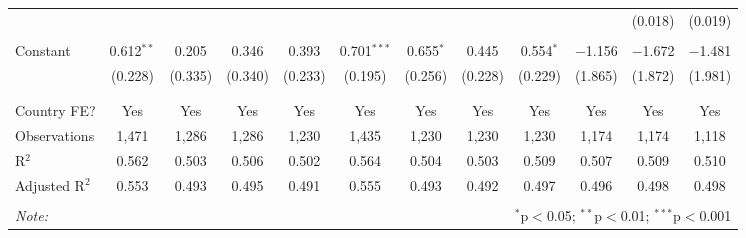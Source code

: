 \begin{table}[!htbp]
\begin{tabular}{@{\extracolsep{5pt}}lccccccccccc}
  &  &  &  &  &  &  &  &  &  & (0.018) & (0.019) \\ 
  & & & & & & & & & & & \\ 
 Constant & 0.612$^{**}$ & 0.205 & 0.346 & 0.393 & 0.701$^{***}$ & 0.655$^{*}$ & 0.445 & 0.554$^{*}$ & $-$1.156 & $-$1.672 & $-$1.481 \\ 
  & (0.228) & (0.335) & (0.340) & (0.233) & (0.195) & (0.256) & (0.228) & (0.229) & (1.865) & (1.872) & (1.981) \\ 
  & & & & & & & & & & & \\ 
\hline \\[-1.8ex] 
Country FE? & Yes & Yes & Yes & Yes & Yes & Yes & Yes & Yes & Yes & Yes & Yes \\ 
Observations & 1,471 & 1,286 & 1,286 & 1,230 & 1,435 & 1,230 & 1,230 & 1,230 & 1,174 & 1,174 & 1,118 \\ 
R$^{2}$ & 0.562 & 0.503 & 0.506 & 0.502 & 0.564 & 0.504 & 0.503 & 0.509 & 0.507 & 0.509 & 0.510 \\ 
Adjusted R$^{2}$ & 0.553 & 0.493 & 0.495 & 0.491 & 0.555 & 0.493 & 0.492 & 0.497 & 0.496 & 0.498 & 0.498 \\ 
\hline 
\hline \\[-1.8ex] 
\textit{Note:}  & \multicolumn{11}{r}{$^{*}$p$<$0.05; $^{**}$p$<$0.01; $^{***}$p$<$0.001} \\ 
\end{tabular} 
\end{table} 
